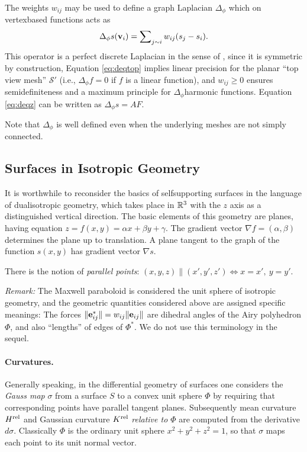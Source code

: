 \documentclass[review]{acmsiggraph}
\def\rel{{\mathord{{\rm rel}}}}
\def\SS{{\mathcal S}}
\begin{document}
The weights $w_{ij}$ may be used to define a graph Laplacian $\Delta_\phi$
which on vertex\dash based functions acts as
	\begin{align*}
	\Delta_{\phi} s({\mathbf v}_i)=\sum\nolimits_{j\sim i} w_{ij}(s_j-s_i).
	\end{align*}
 This operator is a perfect discrete Laplacian in the sense of
\cite{wardetzky07}, since it is symmetric by construction, Equation
\eqref{eq:deqtop} implies linear precision for the planar ``top view
mesh'' $\SS'$ (i.e., $\Delta_\phi f=0$ if $f$ is a linear function), and
$w_{ij}\ge 0$ ensures semidefiniteness and a maximum principle for
$\Delta_\phi$\dash harmonic functions. Equation \eqref{eq:deqz} can be
written as $\Delta_\phi s = AF$.

Note that $\Delta_\phi$ is well defined even when the underlying meshes
are not simply connected.

\subsection{Surfaces in Isotropic Geometry} \label{sec:smooth}

It is worthwhile to reconsider the basics of self\dash supporting surfaces
in the language of dual\dash isotropic geometry, which takes place in
${\mathbb R}^3$ with the $z$ axis as a distinguished vertical direction. The basic
elements of this geometry are planes, having equation $z=f(x,y) = \alpha
x+\beta y+\gamma$. The gradient vector $\nabla f = (\alpha,\beta)$
determines the plane up to translation. A plane tangent to the graph of
the function $s(x,y)$ has gradient vector $\nabla s$.

There is the notion of {\em parallel points}:
	$
	(x,y,z) \parallel (x',y',z') \iff
	x=x',\ y=y'
	.$

{\it Remark:} The Maxwell paraboloid is considered the unit sphere of isotropic
geometry, and the geometric quantities considered above are assigned
specific meanings: The forces $\|{\mathbf e}_{ij}^*\|=w_{ij}\|{\mathbf e}_{ij}\|$
are dihedral angles of the Airy polyhedron $\Phi$, and also ``lengths'' of
edges of $\Phi^*$. We do not use this terminology in the sequel.

\paragraph{Curvatures.}

Generally speaking, in the differential geometry of surfaces one considers
the {\em Gauss map} $\sigma$ from a surface $S$ to a convex unit sphere
$\Phi$ by requiring that corresponding points have parallel tangent
planes.  Subsequently mean curvature $H^\rel$ and Gaussian curvature
$K^\rel$ {\em relative to $\Phi$} are computed from the derivative
$d\sigma$. Classically $\Phi$ is the ordinary unit sphere $x^2+y^2+z^2=1$,
so that $\sigma$ maps each point to its unit normal vector.
\end{document}
